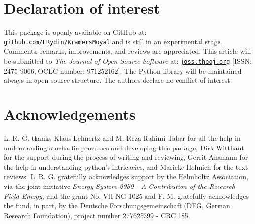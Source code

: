 \documentclass[showpacs,showkeys,10pt,onecolumn,superscriptaddress,notitlepage]{revtex4-1}
\begin{document}
\section{Declaration of interest}
This package is openly available on GitHub at: \texttt{\href{https://github.com/LRydin/KramersMoyal}{github.com/LRydin/KramersMoyal}} and is still in an experimental stage. Comments, remarks, improvements, and reviews are appreciated.
This article will be submitted to \textit{The Journal of Open Source Software} at: \texttt{\href{https://joss.theoj.org}{joss.theoj.org}} [ISSN: 2475-9066, OCLC number: 971252162].
The Python library will be maintained always in open-source structure.
The authors declare no conflict of interest.

\section{Acknowledgements}
L. R. G. thanks Klaus Lehnertz and M. Reza Rahimi Tabar for all the help in understanding stochastic processes and developing this package, Dirk Witthaut for the support during the process of writing and reviewing, Gerrit Ansmann for the help in understanding python's intricacies, and Marieke Helmich for the text reviews.
L. R. G. gratefully acknowledges support by the Helmholtz Association, via the joint initiative \emph{Energy System 2050 - A Contribution of the Research Field Energy}, and the grant No. VH-NG-1025 and F. M. gratefully acknowledges the fund, in part, by the Deutsche Forschungsgemeinschaft (DFG, German Research Foundation), project number 277625399 - CRC 185.


\end{document}
